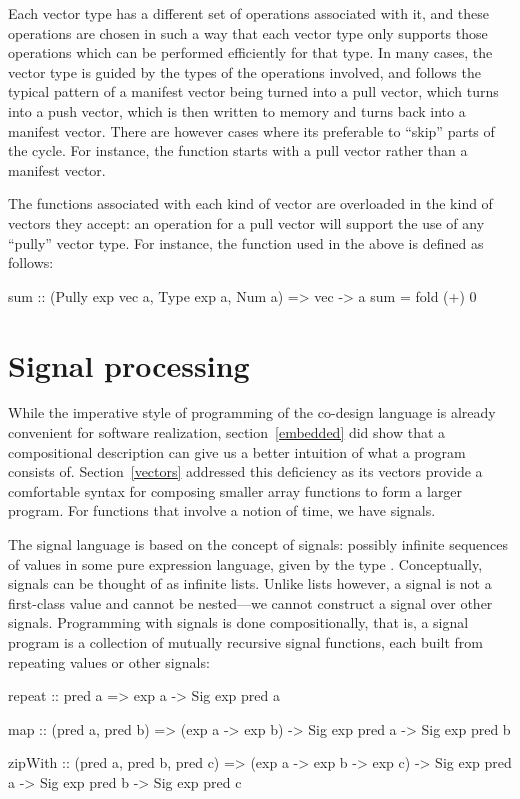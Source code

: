 \documentclass[../paper.tex]{subfiles}
\begin{document}
Each vector type has a different set of operations associated with it, and these operations are chosen in such a way that each vector type only supports those operations which can be performed efficiently for that type. In many cases, the vector type is guided by the types of the operations involved, and follows the typical pattern of a manifest vector being turned into a pull vector, which turns into a push vector, which is then written to memory and turns back into a manifest vector. There are however cases where its preferable to ``skip'' parts of the cycle. For instance, the  function starts with a pull vector rather than a manifest vector.

The functions associated with each kind of vector are overloaded in the kind of vectors they accept: an operation for a pull vector will support the use of any ``pully'' vector type. For instance, the  function used in the above  is defined as follows:

\begin{code}
sum :: (Pully exp vec a, Type exp a, Num a) => vec -> a
sum = fold (+) 0
\end{code}

\section{Signal processing}
\label{signals}

While the imperative style of programming of the co-design language is already convenient for software realization, section~\ref{embedded} did show that a compositional description can give us a better intuition of what a program consists of. Section~\ref{vectors} addressed this deficiency as its vectors provide a comfortable syntax for composing smaller array functions to form a larger program. For functions that involve a notion of time, we have signals.

The signal language is based on the concept of signals: possibly infinite sequences of values in some pure expression language, given by the type . Conceptually, signals can be thought of as infinite lists. Unlike lists however, a signal is not a first-class value and cannot be nested---we cannot construct a signal over other signals. Programming with signals is done compositionally, that is, a signal program is a collection of mutually recursive signal functions, each built from repeating values or other signals:

\begin{code}
repeat :: pred a => exp a -> Sig exp pred a

map :: (pred a, pred b)
  => (exp a -> exp b)
  -> Sig exp pred a -> Sig exp pred b

zipWith :: (pred a, pred b, pred c)
  => (exp a -> exp b -> exp c)
  -> Sig exp pred a -> Sig exp pred b -> Sig exp pred c
\end{code}
\end{document}
